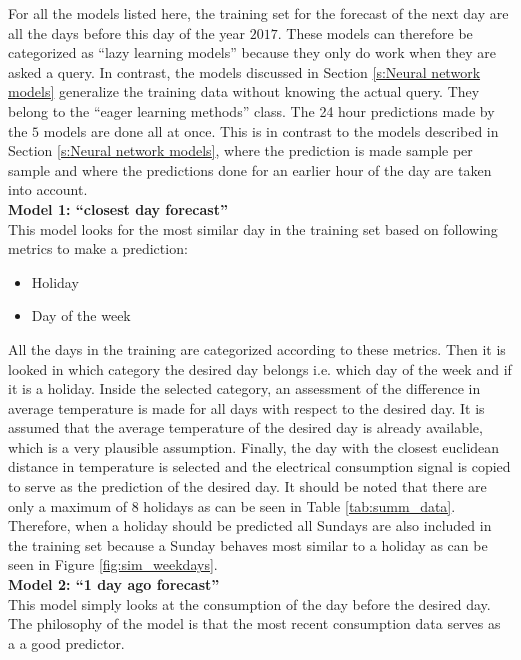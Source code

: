 For all the models listed here, the training set for the forecast of the next day are all the days before this day of the year $ 2017 $. These models can therefore be categorized as ``lazy learning models'' because they only do work when they are asked a query. In contrast, the models discussed in Section \ref{s:Neural network models} generalize the training data without knowing the actual query. They belong to the ``eager learning methods'' class. The 24 hour predictions made by the $ 5 $ models are done all at once. This is in contrast to the models described in Section \ref{s:Neural network models}, where the prediction is made sample per sample and where the predictions done for an earlier hour of the day are taken into account.\\

\textbf{Model 1: ``closest day forecast''}\\
This model looks for the most similar day in the training set based on following metrics to make a prediction:

\begin{itemize}
	\item Holiday
	\item Day of the week
\end{itemize}

 All the days in the training are categorized according to these metrics. Then it is looked in which category the desired day belongs i.e. which day of the week and if it is a holiday. Inside the selected category, an assessment of the difference in average temperature is made for all days with respect to the desired day. It is assumed that the average temperature of the desired day is already available, which is a very plausible assumption. Finally, the day with the closest euclidean distance in temperature is selected and the electrical consumption signal is copied to serve as the prediction of the desired day. It should be noted that there are only a maximum of $ 8 $ holidays as can be seen in Table \ref{tab:summ_data}. Therefore, when a holiday should be predicted all Sundays are also included in the training set because a Sunday behaves most similar to a holiday as can be seen in Figure \ref{fig:sim_weekdays}.\\
 
 \textbf{Model 2: ``1 day ago forecast''}\\
 This model simply looks at the consumption of the day before the desired day. The philosophy of the model is that the most recent consumption data serves as a a good predictor.
 
